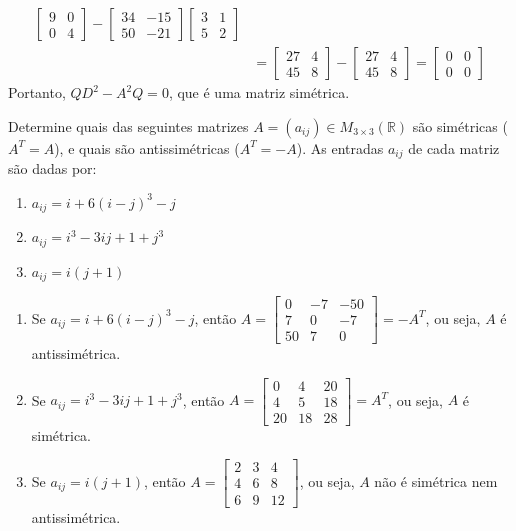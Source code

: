 \documentclass[12pt,a4paper]{article}
\newcommand*\R{\mathbb{R}}
\begin{document}
\begin{ExerciseList}
\begin{enumerate}
\begin{align*}
\begin{bmatrix}
9 & 0 \\
0 & 4
\end{bmatrix}
-
\begin{bmatrix}
34 & -15 \\
50 & -21
\end{bmatrix}
\begin{bmatrix}
3 & 1 \\
5 & 2
\end{bmatrix} \\
& =
\begin{bmatrix}
27 & 4 \\
45 & 8
\end{bmatrix}
-
\begin{bmatrix}
27 & 4 \\
45 & 8
\end{bmatrix}
=
\begin{bmatrix}
0 & 0 \\
0 & 0
\end{bmatrix}
\end{align*}
Portanto, $Q D^2 - A^2 Q = 0$, que é uma matriz simétrica.
\end{enumerate}

\Exercise[title={1,8}] Determine quais das seguintes matrizes $A = (a_{ij}) \in M_{3 \times 3} (\R)$ são simétricas ($A^T = A$), e quais são antissimétricas ($A^T = -A$). As entradas $a_{ij}$ de cada matriz são dadas por:
\begin{multicols}{3}
\begin{enumerate}
\item $a_{ij} = i + 6 (i - j)^3 - j$
\item $a_{ij} = i^3 - 3ij + 1 + j^3$
\item $a_{ij} = i(j+1)$
\end{enumerate}
\end{multicols}
\Answer
\begin{enumerate}
\item Se $a_{ij} = i + 6 (i - j)^3 - j$, então
 $A = \begin{bmatrix}
0 & -7 & -50 \\
7 & 0 & -7\\
50 & 7 & 0
\end{bmatrix} = -A^T$, ou seja, $A$ é antissimétrica.
\item Se $a_{ij} = i^3 - 3ij + 1 + j^3$, então
$A = \begin{bmatrix}
0 & 4 & 20\\
4 & 5 & 18\\
20 & 18 & 28
\end{bmatrix} = A^T$, ou seja, $A$ é simétrica.
\item Se $a_{ij} = i(j+1)$, então
$A = \begin{bmatrix}
2 & 3 & 4 \\
4 & 6 & 8 \\
6 & 9 & 12
\end{bmatrix}$, ou seja, $A$ não é simétrica nem antissimétrica.
\end{enumerate}



\end{ExerciseList}
\end{document}
